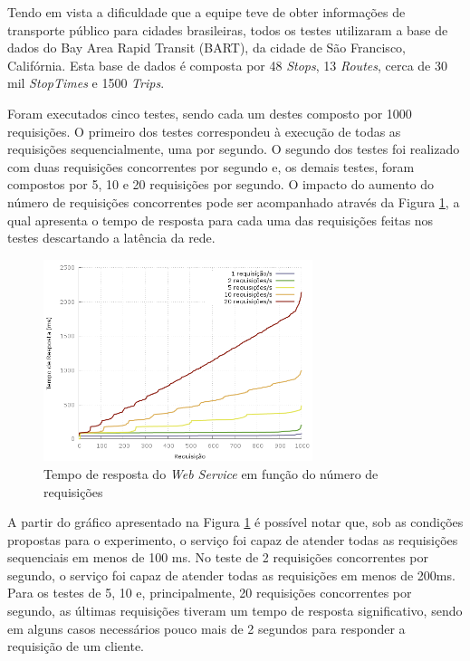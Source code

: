 Tendo em vista a dificuldade que a equipe teve de obter informações de transporte público para cidades brasileiras, todos os testes utilizaram a base de dados do Bay Area Rapid Transit (BART), da cidade de São Francisco, Califórnia.
Esta base de dados é composta por 48 \emph{Stops}, 13 \emph{Routes}, cerca de 30 mil \emph{StopTimes} e 1500 \emph{Trips}.

Foram executados cinco testes, sendo cada um destes composto por 1000 requisições.
O primeiro dos testes correspondeu à execução de todas as requisições sequencialmente, uma por segundo.
O segundo dos testes foi realizado com duas requisições concorrentes por segundo e, os demais testes, foram compostos por 5, 10 e 20 requisições por segundo.
O impacto do aumento do número de requisições concorrentes pode ser acompanhado através da Figura \ref{fig:response}, a qual apresenta o tempo de resposta para cada uma das requisições feitas nos testes descartando a latência da rede.

\begin{figure}[!htb]
	\centering
	\includegraphics[width=0.7\textwidth]{./plots/stresstests/out.png}
	\caption[Tempo de resposta do \emph{Web Service}]{Tempo de resposta do \emph{Web Service} em função do número de requisições}
	\label{fig:response}
\end{figure}

A partir do gráfico apresentado na Figura \ref{fig:response} é possível notar que, sob as condições propostas para o experimento, o serviço foi capaz de atender todas as requisições sequenciais em menos de 100 ms.
No teste de 2 requisições concorrentes por segundo, o serviço foi capaz de atender todas as requisições em menos de 200ms.
Para os testes de 5, 10 e, principalmente, 20 requisições concorrentes por segundo, as últimas requisições tiveram um tempo de resposta significativo, sendo em alguns casos necessários pouco mais de 2 segundos para responder a requisição de um cliente.

